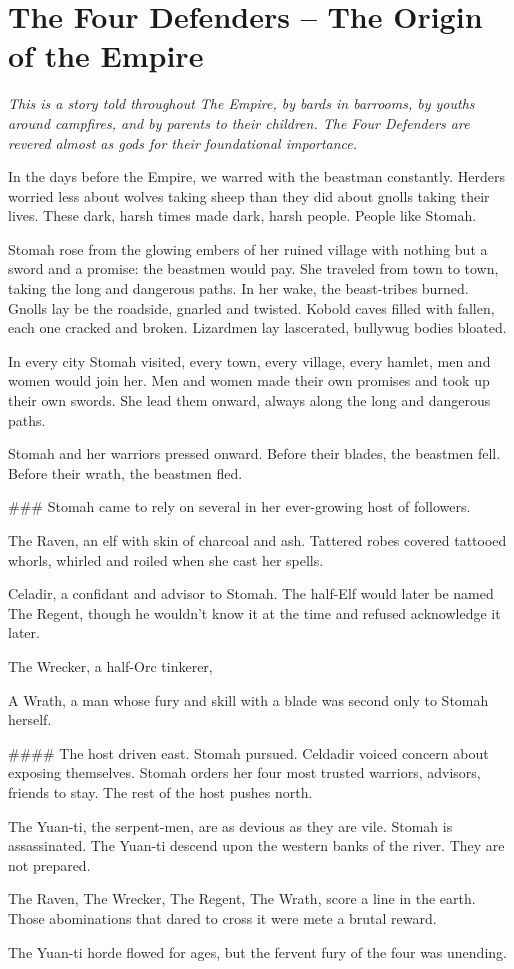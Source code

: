 \section{The Four Defenders -- The Origin of the Empire}

\textit{This is a story told throughout The Empire, by bards in barrooms, by youths around
  campfires, and by parents to their children.
The Four Defenders are revered almost as gods for their foundational importance.}

In the days before the Empire, we warred with the beastman constantly.
Herders worried less about wolves taking sheep than they did about gnolls taking their lives.
These dark, harsh times made dark, harsh people.
People like Stomah.

Stomah rose from the glowing embers of her ruined village with nothing but a sword and a promise:
  the beastmen would pay.
She traveled from town to town, taking the long and dangerous paths.
In her wake, the beast-tribes burned.
Gnolls lay be the roadside, gnarled and twisted.
Kobold caves filled with fallen, each one cracked and broken.
Lizardmen lay lascerated, bullywug bodies bloated.

In every city Stomah visited, every town, every village, every hamlet,
  men and women would join her.
Men and women made their own promises and took up their own swords.
She lead them onward, always along the long and dangerous paths.

Stomah and her warriors pressed onward.
Before their blades, the beastmen fell.
Before their wrath, the beastmen fled.

###
Stomah came to rely on several in her ever-growing host of followers.

The Raven, an elf with skin of charcoal and ash.
Tattered robes covered tattooed whorls, whirled and roiled when she cast her spells.

Celadir, a confidant and advisor to Stomah.
The half-Elf would later be named The Regent, though he wouldn't know it at the time
  and refused acknowledge it later.

The Wrecker, a half-Orc tinkerer,

A Wrath, a man whose fury and skill with a blade was second only to Stomah herself.


####
The host driven east.
Stomah pursued.
Celdadir voiced concern about exposing themselves.
Stomah orders her four most trusted warriors, advisors, friends to stay.
The rest of the host pushes north.

The Yuan-ti, the serpent-men, are as devious as they are vile.
Stomah is assassinated.
The Yuan-ti descend upon the western banks of the river.
They are not prepared.

The Raven, The Wrecker, The Regent, The Wrath, score a line in the earth.
Those abominations that dared to cross it were mete a brutal reward.

The Yuan-ti horde flowed for ages, but the fervent fury of the four was unending.
